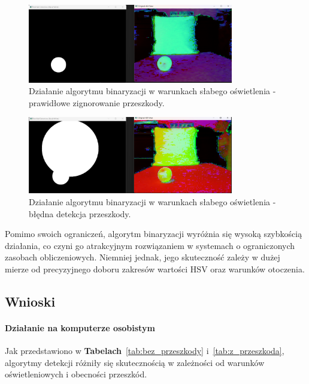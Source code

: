 \documentclass[a4paper,twoside,12pt]{book}
\begin{document}
\begin{figure}[h]
    \centering
    \includegraphics[width=0.8\textwidth]{Images/Porownanie/Binaryzacja/Zrzut ekranu 2025-01-02 193840.png}
    \caption{Działanie algorytmu binaryzacji w warunkach słabego oświetlenia - prawidłowe zignorowanie przeszkody.}
    \label{fig:binary_confusion_badlight_goodobject}
\end{figure}

\begin{figure}[h]
    \centering
    \includegraphics[width=0.8\textwidth]{Images/Porownanie/Binaryzacja/Zrzut ekranu 2025-01-02 193858.png}
    \caption{Działanie algorytmu binaryzacji w warunkach słabego oświetlenia - błędna detekcja przeszkody.}
    \label{fig:binary_confusion_goodlight_badobject}
\end{figure}

Pomimo swoich ograniczeń, algorytm binaryzacji wyróżnia się wysoką szybkością działania, co czyni go atrakcyjnym rozwiązaniem w systemach o ograniczonych zasobach obliczeniowych. Niemniej jednak, jego skuteczność zależy w dużej mierze od precyzyjnego doboru zakresów wartości HSV oraz warunków otoczenia.


\newpage
\subsection{Wnioski}

\paragraph{Działanie na komputerze osobistym}
Jak przedstawiono w \textbf{Tabelach}~\ref{tab:bez_przeszkody} i~\ref{tab:z_przeszkoda}, algorytmy detekcji różniły się skutecznością w zależności od warunków oświetleniowych i obecności przeszkód. 
\end{document}
